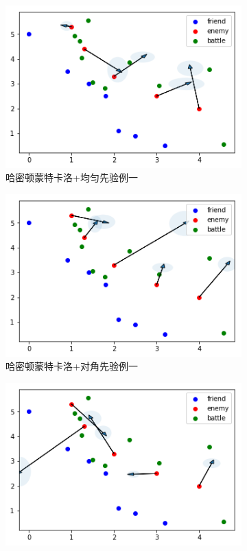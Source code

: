 \documentclass{sicnuthesis}
\begin{document}
\begin{figure}[htb]
  \begin{subfigure}[b]{0.45\linewidth}
    \includegraphics[width=\linewidth]{Sampling11.png}
    \caption{哈密顿蒙特卡洛+均匀先验例一}
  \end{subfigure}
  \begin{subfigure}[b]{0.45\linewidth}
    \includegraphics[width=\linewidth]{Sampling12.png}
    \caption{哈密顿蒙特卡洛+对角先验例一}
  \end{subfigure}
  \begin{subfigure}[b]{0.45\linewidth}
    \includegraphics[width=\linewidth]{Sampling21.png}

\end{subfigure}
\end{figure}
\end{document}
